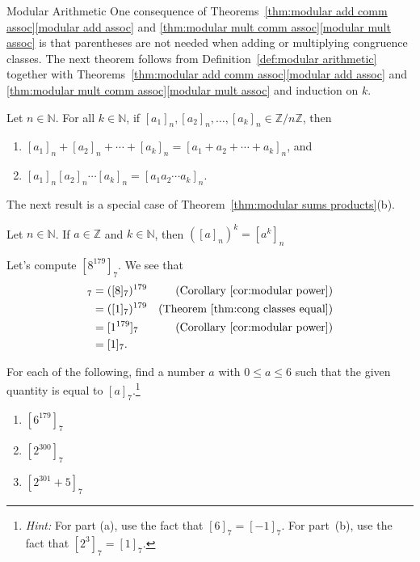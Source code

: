 \begin{section}{Modular Arithmetic}
One consequence of Theorems~\ref{thm:modular add comm assoc}\ref{modular add assoc} and \ref{thm:modular mult comm assoc}\ref{modular mult assoc} is that parentheses are not needed when adding or multiplying congruence classes.  The next theorem follows from Definition~\ref{def:modular arithmetic} together with Theorems~\ref{thm:modular add comm assoc}\ref{modular add assoc} and \ref{thm:modular mult comm assoc}\ref{modular mult assoc} and induction on $k$.

\begin{theorem}\label{thm:modular sums products}
Let $n\in \mathbb{N}$.  For all $k\in \mathbb{N}$, if $[a_1]_n,[a_2]_n,\ldots, [a_k]_n \in \mathbb{Z}/n\mathbb{Z}$, then 
\begin{enumerate}[label=\textrm{(\alph*)}]
\item $[a_1]_n+[a_2]_n+\cdots+ [a_k]_n = [a_1 + a_2 +\cdots+ a_k]_n$, and
\item $[a_1]_n [a_2]_n \cdots  [a_k]_n = [a_1 a_2 \cdots a_k]_n$.
\end{enumerate}
\end{theorem}

The next result is a special case of Theorem~\ref{thm:modular sums products}(b).

\begin{corollary}\label{cor:modular power}
Let $n\in \mathbb{N}$. If $a\in\mathbb{Z}$ and $k\in \mathbb{N}$, then $([a]_n)^k = [a^k]_n$
\end{corollary}

\begin{example}
Let's compute $[8^{179}]_7$.  We see that
\begin{align*}
[8^{179}]_7 & = ([8]_7)^{179} & (\text{Corollary~\ref{cor:modular power}})\\
& = ([1]_7)^{179} & (\text{Theorem~\ref{thm:cong classes equal}})\\
& = [1^{179}]_7 & (\text{Corollary~\ref{cor:modular power}})\\
& = [1]_7.
\end{align*}
\end{example}

\begin{problem}
For each of the following, find a number $a$ with $0\le a \le 6$ such that the given quantity is equal to $[a]_7$.\footnote{\emph{Hint:} For part (a), use the fact that $[6]_7 = [-1]_7$. For part~(b), use the fact that $[2^3]_7 = [1]_7$.}
\begin{enumerate}[label=\textrm{(\alph*)}]
\item $[6^{179}]_7$
\item $[2^{300}]_7$
\item $[2^{301} +5]_7$
\end{enumerate}
\end{problem}


\end{section}
